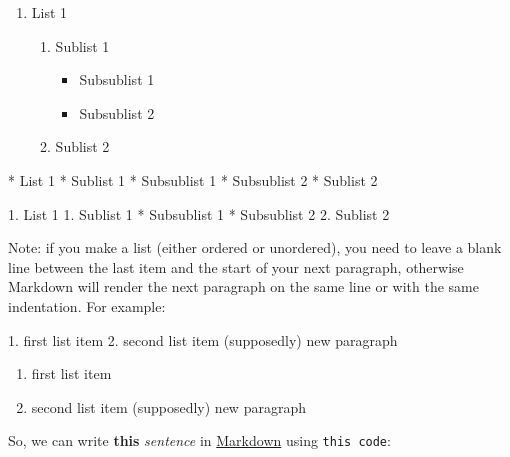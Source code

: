 \documentclass[11pt]{article}
\providecommand{\tightlist}{%
      \setlength{\itemsep}{0pt}\setlength{\parskip}{0pt}}
\newenvironment{Shaded}{}{}
\newcommand{\FloatTok}[1]{\textcolor[rgb]{0.25,0.63,0.44}{{#1}}}
\newcommand{\NormalTok}[1]{{#1}}
\begin{document}
\begin{enumerate}
\def\labelenumi{\arabic{enumi}.}
\tightlist
\item
  List 1

  \begin{enumerate}
  \def\labelenumii{\arabic{enumii}.}
  \tightlist
  \item
    Sublist 1

    \begin{itemize}
    \tightlist
    \item
      Subsublist 1
    \item
      Subsublist 2
    \end{itemize}
  \item
    Sublist 2
  \end{enumerate}
\end{enumerate}

\begin{Shaded}
\begin{Highlighting}[]
\NormalTok{* }\FloatTok{List 1}
\FloatTok{    * Sublist 1}
\FloatTok{        * Subsublist 1}
\FloatTok{        * Subsublist 2}
\FloatTok{    * Sublist 2}


\NormalTok{1. }\FloatTok{List 1}
\FloatTok{    1. Sublist 1}
\FloatTok{        * Subsublist 1}
\FloatTok{        * Subsublist 2}
\FloatTok{    2. Sublist 2}
\end{Highlighting}
\end{Shaded}

Note: if you make a list (either ordered or unordered), you need to
leave a blank line between the last item and the start of your next
paragraph, otherwise Markdown will render the next paragraph on the same
line or with the same indentation. For example:

\begin{Shaded}
\begin{Highlighting}[]
\NormalTok{1. }\FloatTok{first list item}
\FloatTok{2. second list item}
\FloatTok{(supposedly) new paragraph}
\end{Highlighting}
\end{Shaded}

\begin{enumerate}
\def\labelenumi{\arabic{enumi}.}
\tightlist
\item
  first list item
\item
  second list item (supposedly) new paragraph
\end{enumerate}

So, we can write \textbf{this} \emph{sentence} in
\href{https://google.com}{Markdown} using \texttt{this\ code}:
\end{document}
